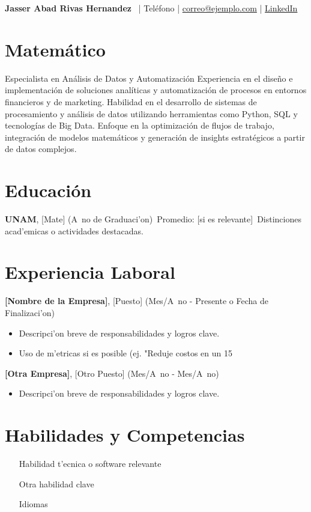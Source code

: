 \documentclass[a4paper,10pt]{article}
\begin{document}
\begin{center}
{\LARGE \textbf{Jasser Abad Rivas Hernandez}} \
| Teléfono | \href{mailto:correo@ejemplo.com}{correo@ejemplo.com} | \href{https://linkedin.com/in/usuario}{LinkedIn}
\end{center}

\section*{Matemático}
Especialista en Análisis de Datos y Automatización
Experiencia en el diseño e implementación de soluciones analíticas y automatización de procesos en entornos financieros y de marketing. Habilidad en el desarrollo de sistemas de procesamiento y análisis de datos utilizando herramientas como Python, SQL y tecnologías de Big Data. Enfoque en la optimización de flujos de trabajo, integración de modelos matemáticos y generación de insights estratégicos a partir de datos complejos.

\section*{Educación}
\textbf{UNAM}, [Mate] \hfill (A~no de Graduaci'on)\
Promedio: [si es relevante]\
Distinciones acad'emicas o actividades destacadas.

\section*{Experiencia Laboral}
\textbf{[Nombre de la Empresa]}, [Puesto] \hfill (Mes/A~no - Presente o Fecha de Finalizaci'on)\
\begin{itemize}
\item Descripci'on breve de responsabilidades y logros clave.
\item Uso de m'etricas si es posible (ej. "Reduje costos en un 15%
\end{itemize}

\textbf{[Otra Empresa]}, [Otro Puesto] \hfill (Mes/A~no - Mes/A~no)\
\begin{itemize}
\item Descripci'on breve de responsabilidades y logros clave.
\end{itemize}

\section*{Habilidades y Competencias}
\begin{itemize}
\item [Habilidad t'ecnica o software relevante]
\item [Otra habilidad clave]
\item [Idiomas]
\end{itemize}
\end{document}

